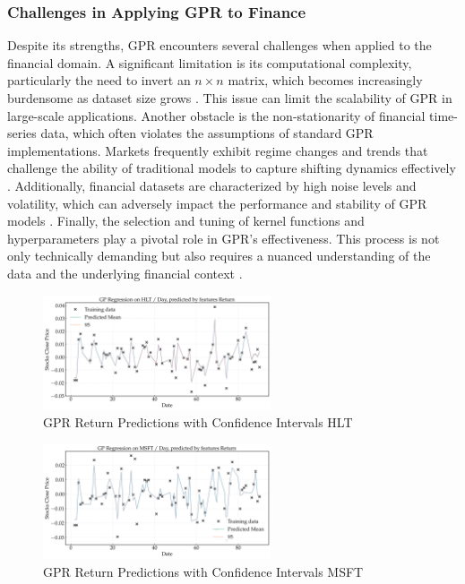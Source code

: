 \subsubsection{Challenges in Applying GPR to Finance}
Despite its strengths, \ac{GPR} encounters several challenges when applied to the financial domain. A significant limitation is its computational complexity, particularly the need to invert an $n \times n$ matrix, which becomes increasingly burdensome as dataset size grows \cite{rasmussen2006gaussian, quinonero2005unifying}. This issue can limit the scalability of \ac{GPR} in large-scale applications.
Another obstacle is the non-stationarity of financial time-series data, which often violates the assumptions of standard \ac{GPR} implementations. Markets frequently exhibit regime changes and trends that challenge the ability of traditional models to capture shifting dynamics effectively \cite{tsay2010analysis, hamilton1994time}.
Additionally, financial datasets are characterized by high noise levels and volatility, which can adversely impact the performance and stability of \ac{GPR} models \cite{cont2001empirical}.
Finally, the selection and tuning of kernel functions and hyperparameters play a pivotal role in \ac{GPR}'s effectiveness. This process is not only technically demanding but also requires a nuanced understanding of the data and the underlying financial context \cite{rasmussen2006gaussian, duvenaud2014automatic}.

\begin{figure}[htbp]
    \centering
    \includegraphics[width=0.6\textwidth]{figures/future_predictions_HLT_return.png}
    \caption{GPR Return Predictions with Confidence Intervals HLT}
    \label{fig:gpr_predictions_HLT}
\end{figure}

\begin{figure}[h]
    \centering
    \includegraphics[width=0.6\textwidth]{figures/future_predictions_MSFT_return.png}
    \caption{GPR Return Predictions with Confidence Intervals MSFT}
    \label{fig:gpr_predictions_MSFT}
\end{figure}

